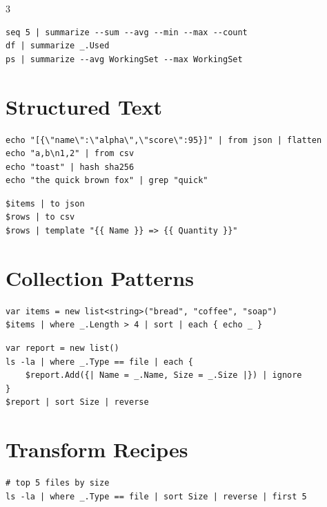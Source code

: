 \begin{multicols*}{3}
\begin{lstlisting}
seq 5 | summarize --sum --avg --min --max --count
df | summarize _.Used
ps | summarize --avg WorkingSet --max WorkingSet
\end{lstlisting}


\section{Structured Text}
\begin{lstlisting}
echo "[{\"name\":\"alpha\",\"score\":95}]" | from json | flatten
echo "a,b\n1,2" | from csv
echo "toast" | hash sha256
echo "the quick brown fox" | grep "quick"
\end{lstlisting}

\begin{lstlisting}
$items | to json
$rows | to csv
$rows | template "{{ Name }} => {{ Quantity }}"
\end{lstlisting}

\columnbreak

\section{Collection Patterns}
\begin{lstlisting}
var items = new list<string>("bread", "coffee", "soap")
$items | where _.Length > 4 | sort | each { echo _ }
\end{lstlisting}

\begin{lstlisting}
var report = new list()
ls -la | where _.Type == file | each {
    $report.Add({| Name = _.Name, Size = _.Size |}) | ignore
}
$report | sort Size | reverse
\end{lstlisting}

\section{Transform Recipes}
\begin{lstlisting}
# top 5 files by size
ls -la | where _.Type == file | sort Size | reverse | first 5


\end{lstlisting}
\end{multicols*}
